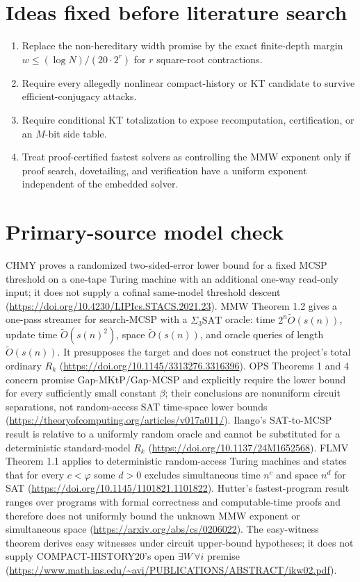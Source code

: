 \documentclass[11pt]{article}
\begin{document}
\section*{Ideas fixed before literature search}
\begin{enumerate}
\item Replace the non-hereditary width promise by the exact finite-depth
margin $w\leq(\log N)/(20\cdot 2^r)$ for $r$ square-root contractions.
\item Require every allegedly nonlinear compact-history or KT candidate to
survive efficient-conjugacy attacks.
\item Require conditional KT totalization to expose recomputation,
certification, or an $M$-bit side table.
\item Treat proof-certified fastest solvers as controlling the MMW exponent
only if proof search, dovetailing, and verification have a uniform exponent
independent of the embedded solver.
\end{enumerate}

\section*{Primary-source model check}
CHMY proves a randomized two-sided-error lower bound for a fixed MCSP threshold
on a one-tape Turing machine with an additional one-way read-only input; it
does not supply a cofinal same-model threshold descent
(\url{https://doi.org/10.4230/LIPIcs.STACS.2021.23}).
MMW Theorem 1.2 gives a one-pass streamer for search-MCSP with a
$\Sigma_3\mathrm{SAT}$ oracle: time $2^n\widetilde O(s(n))$, update time
$\widetilde O(s(n)^2)$, space $\widetilde O(s(n))$, and oracle queries of
length $\widetilde O(s(n))$. It presupposes the target and does not construct
the project's total ordinary $R_k$
(\url{https://doi.org/10.1145/3313276.3316396}).
OPS Theorems 1 and 4 concern promise Gap-MKtP/Gap-MCSP and explicitly require
the lower bound for every sufficiently small constant $\beta$; their
conclusions are nonuniform circuit separations, not random-access SAT
time-space lower bounds
(\url{https://theoryofcomputing.org/articles/v017a011/}).
Ilango's SAT-to-MCSP result is relative to a uniformly random oracle and cannot
be substituted for a deterministic standard-model $R_k$
(\url{https://doi.org/10.1137/24M1652568}).
FLMV Theorem 1.1 applies to deterministic random-access Turing machines and
states that for every $c<\varphi$ some $d>0$ excludes simultaneous
time $n^c$ and space $n^d$ for SAT
(\url{https://doi.org/10.1145/1101821.1101822}).
Hutter's fastest-program result ranges over programs with formal correctness
and computable-time proofs and therefore does not uniformly bound the unknown
MMW exponent or simultaneous space
(\url{https://arxiv.org/abs/cs/0206022}).
The easy-witness theorem derives easy witnesses under circuit upper-bound
hypotheses; it does not supply COMPACT-HISTORY20's open
$\exists W\,\forall i$ premise
(\url{https://www.math.ias.edu/~avi/PUBLICATIONS/ABSTRACT/ikw02.pdf}).
\end{document}
